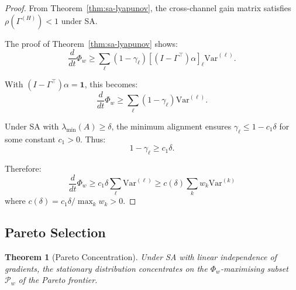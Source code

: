 \documentclass[12pt]{article}
\newtheorem{theorem}{Theorem}[section]
\newcommand{\Var}{\mathrm{Var}}
\begin{document}
\begin{proof}
From Theorem~\ref{thm:sa-lyapunov}, the cross-channel gain matrix satisfies $\rho(\Gamma^{(H)}) < 1$ under SA.

The proof of Theorem~\ref{thm:sa-lyapunov} shows:
\[
\frac{d}{dt} \Phi_w \geq \sum_\ell (1 - \gamma_\ell) \left[ (I - \Gamma^\top) \alpha \right]_\ell \Var^{(\ell)}.
\]

With $(I - \Gamma^\top)\alpha = \mathbf{1}$, this becomes:
\[
\frac{d}{dt} \Phi_w \geq \sum_\ell (1 - \gamma_\ell) \Var^{(\ell)}.
\]

Under SA with $\lambda_{\min}(A) \geq \delta$, the minimum alignment ensures $\gamma_\ell \leq 1 - c_1 \delta$ for some constant $c_1 > 0$. Thus:
\[
1 - \gamma_\ell \geq c_1 \delta.
\]

Therefore:
\[
\frac{d}{dt} \Phi_w \geq c_1 \delta \sum_\ell \Var^{(\ell)} \geq c(\delta) \sum_k w_k \Var^{(k)}
\]
where $c(\delta) = c_1 \delta / \max_k w_k > 0$.
\end{proof}

\subsection{Pareto Selection}

\begin{theorem}[Pareto Concentration]
\label{thm:pareto}
Under SA with linear independence of gradients, the stationary distribution concentrates on the $\Phi_w$-maximising subset $\mathcal{P}_w$ of the Pareto frontier.
\end{theorem}
\end{document}
